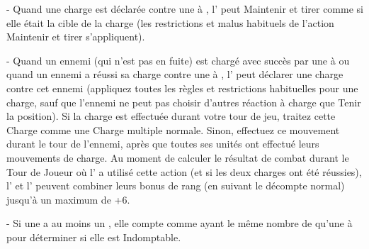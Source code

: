 \begin{customsubitemize}
	\item[-] Quand une charge est déclarée contre une \parentunit{} à , l'\supportunit{} peut Maintenir et tirer comme si elle était la cible de la charge (les restrictions et malus habituels de l'action Maintenir et tirer s'appliquent).
	\item[-] Quand un ennemi (qui n'est pas en fuite) est chargé avec succès par une \parentunit{} à  ou quand un ennemi a réussi sa charge contre une \parentunit{} à , l'\supportunit{} peut déclarer une charge contre cet ennemi (appliquez toutes les règles et restrictions habituelles pour une charge, sauf que l'ennemi ne peut pas choisir d'autres réaction à charge que Tenir la position). Si la charge est effectuée durant votre tour de jeu, traitez cette Charge comme une Charge multiple normale. Sinon, effectuez ce mouvement durant le tour de l'ennemi, après que toutes ses unités ont effectué leurs mouvements de charge. Au moment de calculer le résultat de combat durant le Tour de Joueur où l'\supportunit{} a utilisé cette action (et si les deux charges ont été réussies), l'\supportunit{} et l'\parentunit{} peuvent combiner leurs bonus de rang (en suivant le décompte normal) jusqu'à un maximum de +6.
	\item[-] Si une \supportunit{} a au moins un \fullrank{}, elle compte comme ayant le même nombre de \fullrank{} qu'une \parentunit{} à  pour déterminer si elle est Indomptable.
\end{customsubitemize}

\armyspecialruleentry{\orders}

